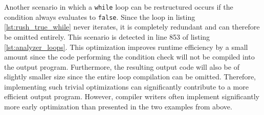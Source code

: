 Another scenario in which a \texttt{while} loop can be restructured occurs if the condition always evaluates to \texttt{false}.
Since the loop in listing \ref{lst:rush_true_while} never iterates, it is completely redundant and can therefore be omitted entirely.
This scenario is detected in line 853 of listing \ref{lst:analyzer_loops}.
This optimization improves runtime efficiency by a small amount since the code performing the condition check will not be compiled into the output program.
Furthermore, the resulting output code will also be of slightly smaller size since the entire loop compilation can be omitted.
Therefore, implementing such trivial optimizations can significantly contribute to a more efficient output program.
However, compiler writers often implement significantly more early optimization than presented in the two examples from above.
